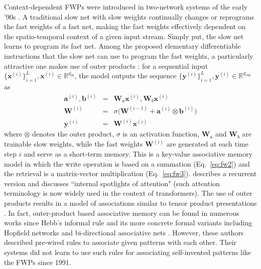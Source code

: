 \documentclass{article}
\def\va{{\bm{a}}}
\def\vb{{\bm{b}}}
\def\vx{{\bm{x}}}
\def\vy{{\bm{y}}}
\def\mW{{\bm{W}}}
\theoremstyle{definition}
\begin{document}
Context-dependent FWPs were
introduced in two-network systems of the early '90s \citep{Schmidhuber:91fastweights, schmidhuber1992learning, schmidhuber1993reducing,schmidhuber2021fwp}.
A traditional slow net with slow weights continually changes or reprograms the fast weights of a fast net,
making the fast weights effectively dependent on the spatio-temporal context of a given input stream.
Simply put, the slow net learns to program its fast net. 
Among the proposed elementary differentiable instructions that the slow net can use to program the fast weights,
a particularly attractive one makes use of outer products \citep{Schmidhuber:91fastweights, schmidhuber1992learning}:
for a sequential input $\{ \vx^{(i)} \}_{i=1}^L, \vx^{(i)} \in \mathbb{R}^{d_\text{in}}$,
the model outputs the sequence $\{ \vy^{(i)} \}_{i=1}^L, \vy^{(i)} \in \mathbb{R}^{d_\text{out}}$ as
\begin{eqnarray}
\va^{(i)}, \vb^{(i)} &=& \mW_{a} \vx^{(i)}, \mW_{b} \vx^{(i)} \label{eq:fw1} \\
\mW^{(i)} &=& \sigma\big(\mW^{(i-1)} + \va^{(i)} \otimes \vb^{(i)}\big) \label{eq:fw2} \\
\vy^{(i)} &=& \mW^{(i)} \vx^{(i)} \label{eq:fw3}
\end{eqnarray}
where $\otimes$ denotes the outer product, $\sigma$ is an activation function, $\mW_{a}$ and $\mW_{b}$ are trainable slow weights, while the fast weights $\mW^{(i)}$ are generated at each time step $i$ and serve as a short-term memory.
This is a key-value associative memory model in which the write operation is based on a summation (Eq.~\ref{eq:fw2})
and the retrieval is a matrix-vector multiplication (Eq.~\ref{eq:fw3}).
\citet{schmidhuber1993reducing} describes a recurrent version and discusses ``internal spotlights of attention" (such attention terminology is now widely used in the context of transformers).
The use of outer products results in a model of associations similar to tensor product presentations \cite{smolensky1990tensor}.
In fact, outer-product based associative memory can be found in
numerous works since Hebb's informal rule \citep{hebb1949organization} and its more concrete formal variants  \citep{steinbuch61, steinbuchP63, kohonen72, palm1980associative} including Hopfield networks \citep{hopfield1982neural, little1974existence} and bi-directional associative nets \citep{kosko1988bidirectional}. However, these authors described pre-wired rules to associate given patterns with each other. Their systems did not learn to use such rules for associating self-invented patterns like the FWPs since 1991.
\end{document}
